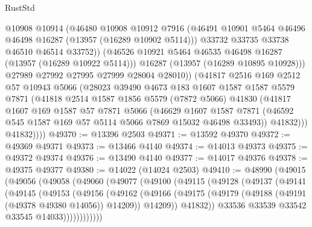 \begin{lexlean}{RustStd}
\begin{coremodule}
                  @10908
                  @10914
                  (@46480
                    @10908
                    @10912
                    @7916
                    (@46491 @10901 @5464 @46496 @46498 @16287 (@13957 (@16289 @10902 @5114)))
                    @33732
                    @33735
                    @33738
                    @46510
                    @46514
                    @33752))
                (@46526 @10921 @5464 @46535 @46498 @16287 (@13957 (@16289 @10922 @5114)))
                @16287
                (@13957 (@16289 @10895 @10928)))
              @27989
              @27992
              @27995
              @27999
              @28004
              @28010))
          (@41817
            @2516
            @169
            @2512
            @57
            @10943
            @5066
            (@28023
              @39490
              @4673
              @183
              @1607
              @1587
              @1587
              @5579
              @7871
              (@41818
                @2514
                @1587
                @1856
                @5579
                (@7872 @5066)
                @41830
                (@41817
                  @1607
                  @169
                  @1587
                  @57
                  @7871
                  @5066
                  (@46629
                    @1607
                    @1587
                    @7871
                    (@46592 @545 @1587 @169 @57 @5114 @5066 @7869 @15032 @46498 @33493))
                  @41832)))
            @41832))))
@49370 := @13396 @2503
@49371 := @13592 @49370
@49372 := @49369 @49371
@49373 := @13466 @4140
@49374 := @14013 @49373
@49375 := @49372 @49374
@49376 := @13490 @4140
@49377 := @14017 @49376
@49378 := @49375 @49377
@49380 := @14022 (@14024 @2503)
@49410 := @48990
    (@49015
      (@49056
        (@49058
          (@49060
            (@49077
              (@49100
                (@49115
                  (@49128
                    (@49137
                      (@49141
                        (@49145
                          (@49153
                            (@49156
                              (@49162
                                (@49166
                                  (@49175
                                    (@49179 (@49188 (@49191 (@49378 @49380 @14056)) @14209))
                                    @14209))
                                @41832))
                            @33536
                            @33539
                            @33542
                            @33545
                            @14033))))))))))))

\end{coremodule}
\end{lexlean}
